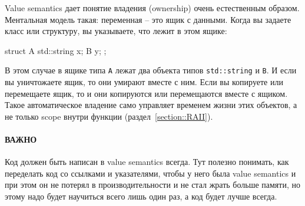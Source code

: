Value semantics дает понятие владения (ownership) очень естественным образом.
Ментальная модель такая: переменная -- это ящик с данными.
Когда вы задаете класс или структуру, вы указываете, что лежит в этом ящике:
\begin{cppcode}
struct A {
  std::string x;
  B y;
};
\end{cppcode}
В этом случае в ящике типа \verb"A" лежат два объекта типов \verb"std::string" и \verb"B".
И если вы уничтожаете ящик, то они умирают вместе с ним.
Если вы копируете или перемещаете ящик, то и они копируются или перемещаются вместе с ящиком.
Такое автоматическое владение само управляет временем жизни этих объектов, а не только scope внутри функции (раздел~\ref{section::RAII}).

\paragraph{ВАЖНО}

Код должен быть написан в value semantics всегда.
Тут полезно понимать, как переделать код со ссылками и указателями, чтобы у него была value semantics и при этом он не потерял в производительности и не стал жрать больше памяти, но этому надо будет научиться всего лишь один раз, а код будет лучше всегда.
